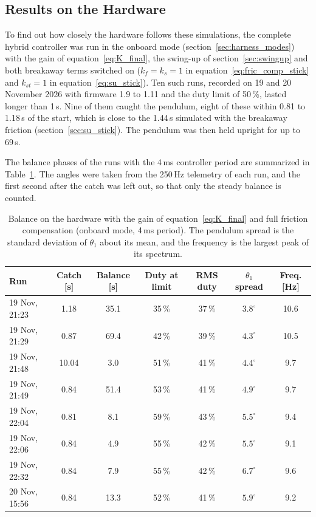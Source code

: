 \documentclass[a4paper,11pt]{article}
\begin{document}
\subsection{Results on the Hardware}
\label{sec:lqr_hw}
To find out how closely the hardware follows these simulations, the complete hybrid controller was run in the onboard mode (section~\ref{sec:harness_modes}) with the gain of equation~\ref{eq:K_final}, the swing-up of section~\ref{sec:swingup} and both breakaway terms switched on ($k_f = k_s = 1$ in equation~\ref{eq:fric_comp_stick} and $k_{st} = 1$ in equation~\ref{eq:su_stick}). Ten such runs, recorded on 19 and 20 November 2026 with firmware 1.9 to 1.11 and the duty limit of 50\,\%, lasted longer than 1\,s. Nine of them caught the pendulum, eight of these within 0.81 to 1.18\,s of the start, which is close to the 1.44\,s simulated with the breakaway friction (section~\ref{sec:su_stick}). The pendulum was then held upright for up to 69\,s.

The balance phases of the runs with the 4\,ms controller period are summarized in Table~\ref{tab:lqr_hw}. The angles were taken from the 250\,Hz telemetry of each run, and the first second after the catch was left out, so that only the steady balance is counted.

\begin{table}[h]
\centering
\caption{Balance on the hardware with the gain of equation~\ref{eq:K_final} and full friction compensation (onboard mode, 4\,ms period). The pendulum spread is the standard deviation of $\theta_1$ about its mean, and the frequency is the largest peak of its spectrum.}
\label{tab:lqr_hw}
\small
\begin{tabular}{@{}lcccccc@{}}
\toprule
Run & Catch [s] & Balance [s] & Duty at limit & RMS duty & $\theta_1$ spread & Freq. [Hz] \\
\midrule
19 Nov, 21:23 & 1.18 & 35.1 & 35\,\% & 37\,\% & $3.8^\circ$ & 10.6 \\
19 Nov, 21:29 & 0.87 & 69.4 & 42\,\% & 39\,\% & $4.3^\circ$ & 10.5 \\
19 Nov, 21:48 & 10.04 & 3.0 & 51\,\% & 41\,\% & $4.4^\circ$ & 9.7 \\
19 Nov, 21:49 & 0.84 & 51.4 & 53\,\% & 41\,\% & $4.9^\circ$ & 9.7 \\
19 Nov, 22:04 & 0.81 & 8.1 & 59\,\% & 43\,\% & $5.5^\circ$ & 9.4 \\
19 Nov, 22:06 & 0.84 & 4.9 & 55\,\% & 42\,\% & $5.5^\circ$ & 9.1 \\
19 Nov, 22:32 & 0.84 & 7.9 & 55\,\% & 42\,\% & $6.7^\circ$ & 9.6 \\
20 Nov, 15:56 & 0.84 & 13.3 & 52\,\% & 41\,\% & $5.9^\circ$ & 9.2 \\
\bottomrule
\end{tabular}
\end{table}
\end{document}
